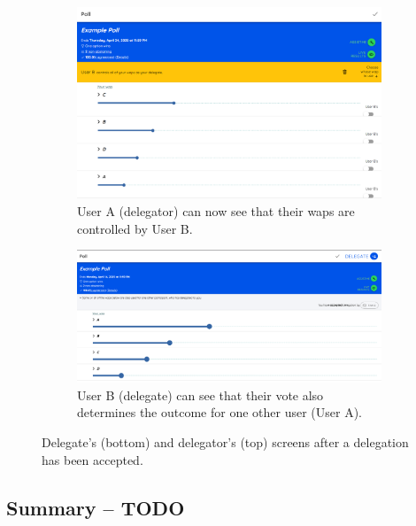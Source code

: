 \begin{figure}[H]
  \centering
  \begin{subfigure}[t]{0.8\linewidth}
    \centering
    \includegraphics[width=\linewidth]{../common/vodle_screenshots/userA_after.png}
    \caption{User A (delegator) can now see that their waps are controlled by User B.}
    \label{fig:userA_after}
  \end{subfigure}

  \vspace{1em}

  \begin{subfigure}[t]{0.8\linewidth}
    \centering
    \includegraphics[width=\linewidth]{../common/initial_vodle_screenshots/userB_after.png}
    \caption{User B (delegate) can see that their vote also determines the outcome for one other user (User A).}
    \label{fig:userB_after}
  \end{subfigure}

  \caption{Delegate's (bottom) and delegator's (top) screens after a delegation has been accepted.}
  \label{fig:delegation_flow_ui}
\end{figure}
\subsection{Summary -- TODO}


